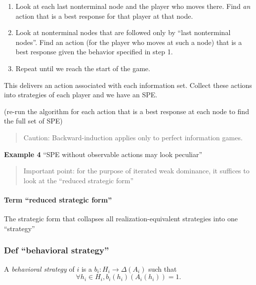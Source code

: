 \documentclass[
]{article}
\providecommand{\tightlist}{%
  \setlength{\itemsep}{0pt}\setlength{\parskip}{0pt}}
\begin{document}
\begin{enumerate}
\def\labelenumi{\arabic{enumi}.}
\tightlist
\item
  Look at each last nonterminal node and the player who moves there.
  Find \emph{an} action that is a best response for that player at that
  node.
\item
  Look at nonterminal nodes that are followed only by ``last nonterminal
  nodes''. Find an action (for the player who moves at such a node) that
  is a best response given the behavior specified in step 1.
\item
  Repeat until we reach the start of the game.
\end{enumerate}

This delivers an action associated with each information set. Collect
these actions into strategies of each player and we have an SPE.

(re-run the algorithm for each action that is a best response at each
node to find the full set of SPE)

\begin{quote}
Caution: Backward-induction applies only to perfect information games.
\end{quote}

\textbf{Example 4} ``SPE without observable actions may look peculiar''

\begin{quote}
Important point: for the purpose of iterated weak dominance, it suffices
to look at the ``reduced strategic form''
\end{quote}

\hypertarget{term-reduced-strategic-form}{%
\paragraph{Term ``reduced strategic
form''}\label{term-reduced-strategic-form}}

The strategic form that collapses all realization-equivalent strategies
into one ``strategy''

\hypertarget{def-behavioral-strategy}{%
\subsubsection{Def ``behavioral
strategy''}\label{def-behavioral-strategy}}

A \emph{behavioral strategy} of \(i\) is a
\(b_i: H_i \rightarrow \Delta(A_i)\) such that
\[\forall h_i \in H_i, b_i(h_i)(A_i(h_i))=1.\]
\end{document}

